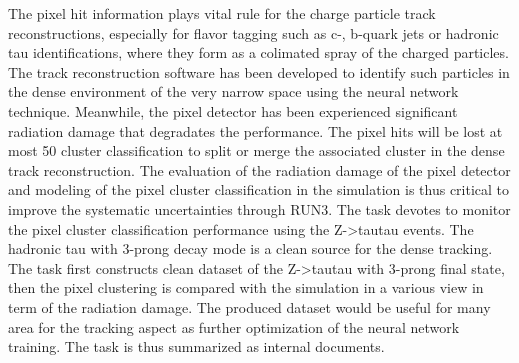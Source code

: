 \documentclass{article}
\begin{document}
The pixel hit information plays vital rule for the charge particle track reconstructions,
especially for flavor tagging such as c-, b-quark jets or hadronic tau identifications, where
they form as a colimated spray of the charged particles. The track reconstruction software
has been developed to identify such particles in the dense environment of the very narrow
space using the neural network technique. Meanwhile, the pixel detector has been experienced
significant radiation damage that degradates the performance. The pixel hits will be lost at
most 50%
cluster classification to split or merge the associated cluster in the dense track reconstruction.
The evaluation of the radiation damage of the pixel detector and modeling of the pixel cluster
classification in the simulation is thus critical to improve the systematic uncertainties through
RUN3.
The task devotes to monitor the pixel cluster classification performance using the
Z->tautau events. The hadronic tau with 3-prong decay mode is a clean source for the dense
tracking. The task first constructs clean dataset of the Z->tautau with 3-prong final state, then
the pixel clustering is compared with the simulation in a various view in term of the radiation
damage. The produced dataset would be useful for many area for the tracking aspect as further
optimization of the neural network training. The task is thus summarized as internal documents.





\end{document}
